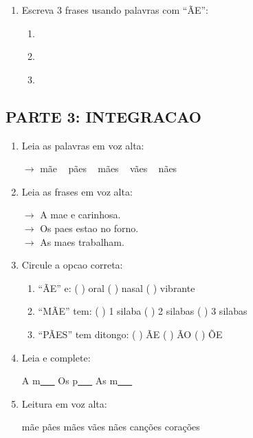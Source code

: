 \begin{exercicio}
\begin{enumerate}[resume]
  \item Escreva 3 frases usando palavras com ``ÃE'':
  \begin{enumerate}[label=\alph*)]
    \item \underline{\hspace{8cm}}
    \item \underline{\hspace{8cm}}
    \item \underline{\hspace{8cm}}
  \end{enumerate}
\end{enumerate}

\subsection*{PARTE 3: INTEGRACAO}

\begin{enumerate}[resume]
  \item Leia as palavras em voz alta:
  \begin{center}
  $\rightarrow$ mãe  ~  pães  ~  mães  ~  vães  ~  nães
  \end{center}

  \item Leia as frases em voz alta:
  \begin{center}
  $\rightarrow$ A mae e carinhosa.\\
  $\rightarrow$ Os paes estao no forno.\\
  $\rightarrow$ As maes trabalham.
  \end{center}

  \item Circule a opcao correta:
  \begin{enumerate}[label=(\alph*)]
    \item ``ÃE'' e: ( ) oral ( ) nasal ( ) vibrante
    \item ``MÃE'' tem: ( ) 1 silaba ( ) 2 silabas ( ) 3 silabas
    \item ``PÃES'' tem ditongo: ( ) ÃE ( ) ÃO ( ) ÕE
  \end{enumerate}

  \item Leia e complete:
  \begin{center}
  A m\underline{~~~} \quad Os p\underline{~~~} \quad As m\underline{~~~}
  \end{center}

  \item Leitura em voz alta:
  \begin{center}
  mãe \quad pães \quad mães \quad vães \quad nães \quad canções \quad corações
  \end{center}
\end{enumerate}
\end{exercicio}

